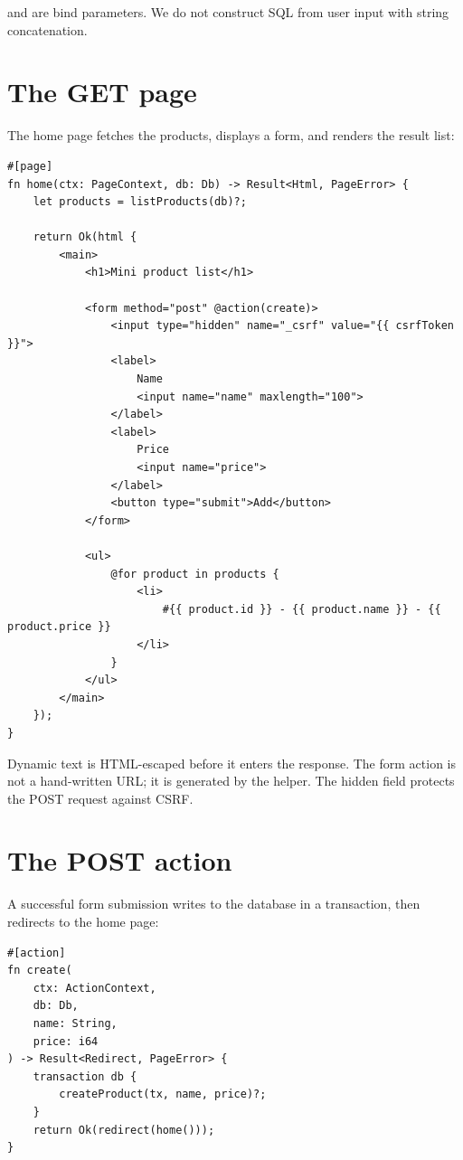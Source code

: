  and  are bind parameters. We do not construct SQL from user input with string concatenation.

\section{The GET page}

The home page fetches the products, displays a form, and renders the result list:

\begin{lstlisting}[language=Velran]
#[page]
fn home(ctx: PageContext, db: Db) -> Result<Html, PageError> {
    let products = listProducts(db)?;

    return Ok(html {
        <main>
            <h1>Mini product list</h1>

            <form method="post" @action(create)>
                <input type="hidden" name="_csrf" value="{{ csrfToken }}">
                <label>
                    Name
                    <input name="name" maxlength="100">
                </label>
                <label>
                    Price
                    <input name="price">
                </label>
                <button type="submit">Add</button>
            </form>

            <ul>
                @for product in products {
                    <li>
                        #{{ product.id }} - {{ product.name }} - {{ product.price }}
                    </li>
                }
            </ul>
        </main>
    });
}
\end{lstlisting}

Dynamic text is HTML-escaped before it enters the response. The form action is not a hand-written URL; it is generated by the  helper. The hidden  field protects the POST request against CSRF.

\section{The POST action}

A successful form submission writes to the database in a transaction, then redirects to the home page:

\begin{lstlisting}[language=Velran]
#[action]
fn create(
    ctx: ActionContext,
    db: Db,
    name: String,
    price: i64
) -> Result<Redirect, PageError> {
    transaction db {
        createProduct(tx, name, price)?;
    }
    return Ok(redirect(home()));
}
\end{lstlisting}

